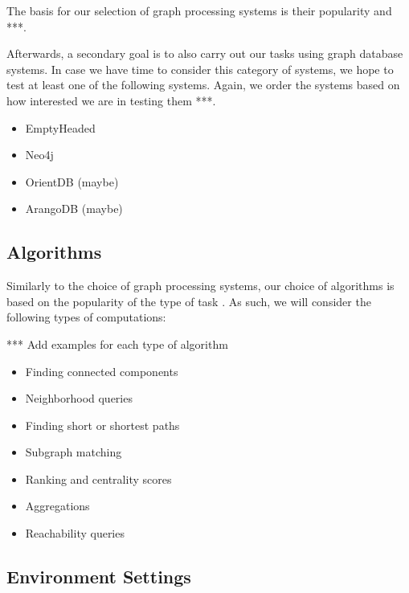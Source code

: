 \documentclass[a4paper,11pt]{article}
\begin{document}
\par The basis for our selection of graph processing systems is their popularity \cite{survey} and ***.

\medskip

\par Afterwards, a secondary goal is to also carry out our tasks using graph database systems. In case we have time to consider this category of systems, we hope to test at least one of the following systems. Again, we order the systems based on how interested we are in testing them ***.

\begin{itemize}

	\item EmptyHeaded \cite{emptyheaded} \cite{emptyheadedgit}
	\item Neo4j \cite{neo4j}
	\item OrientDB \cite{orientdb} (maybe)
	\item ArangoDB \cite{arangodb} (maybe)

\end{itemize}

\subsection{Algorithms} \label{algos}

\par Similarly to the choice of graph processing systems, our choice of algorithms is based on the popularity of the type of task \cite{survey}. As such, we will consider the following types of computations:

*** Add examples for each type of algorithm

\begin{itemize}
	\item Finding connected components
	\item Neighborhood queries
	\item Finding short or shortest paths
	\item Subgraph matching
	\item Ranking and centrality scores
	\item Aggregations
	\item Reachability queries
\end{itemize}

\subsection{Environment Settings}
\end{document}
